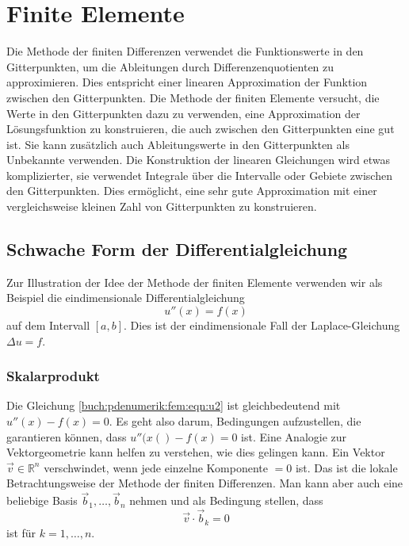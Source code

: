 %
%
\section{Finite Elemente
\label{buch:pdenumerik:section:fem}}
Die Methode der finiten Differenzen verwendet die Funktionswerte
in den Gitterpunkten, um die Ableitungen durch Differenzenquotienten
zu approximieren.
Dies entspricht einer linearen Approximation der Funktion zwischen
den Gitterpunkten.
Die Methode der finiten Elemente versucht, die Werte in den
Gitterpunkten dazu zu verwenden, eine Approximation der Lösungsfunktion
zu konstruieren, die auch zwischen den Gitterpunkten eine gut ist.
Sie kann zusätzlich auch Ableitungswerte in den Gitterpunkten als
Unbekannte verwenden.
Die Konstruktion der linearen Gleichungen wird etwas komplizierter,
sie verwendet Integrale über die Intervalle oder Gebiete zwischen
den Gitterpunkten.
Dies ermöglicht, eine sehr gute Approximation mit einer vergleichsweise
kleinen Zahl von Gitterpunkten zu konstruieren.

%
%
\subsection{Schwache Form der Differentialgleichung}
Zur Illustration der Idee der Methode der finiten Elemente verwenden wir
als Beispiel die eindimensionale Differentialgleichung
\begin{equation}
u''(x) = f(x)
\label{buch:pdenumerik:fem:eqn:u2}
\end{equation}
auf dem Intervall $[a,b]$.
Dies ist der eindimensionale Fall der Laplace-Gleichung $\Delta u = f$.

%
%
\subsubsection{Skalarprodukt}
Die Gleichung \eqref{buch:pdenumerik:fem:eqn:u2} ist gleichbedeutend
mit $u''(x)-f(x)=0$.
Es geht also darum, Bedingungen aufzustellen, die garantieren können,
dass $u''(x()-f(x)=0$ ist.
Eine Analogie zur Vektorgeometrie kann helfen zu verstehen, wie dies 
gelingen kann.
Ein Vektor $\vec{v}\in\mathbb{R}^n$ verschwindet, wenn jede einzelne
Komponente $=0$ ist.
Das ist die lokale Betrachtungsweise der Methode der finiten Differenzen.
Man kann aber auch eine beliebige Basis $\vec{b}_1,\dots,\vec{b}_n$ nehmen
und als Bedingung stellen, dass 
\[
\vec{v}\cdot\vec{b}_k = 0
\]
ist für $k=1,\dots,n$.

